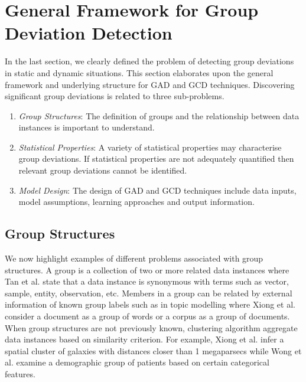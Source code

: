 \section{ General Framework for Group Deviation Detection
}
 \label{Sec:Framework}
In the last section, we clearly defined the problem of detecting group deviations in static and dynamic situations.   
  This section elaborates  upon the general framework and underlying structure for GAD and GCD techniques. Discovering significant group deviations is related to three sub-problems. 
\begin{enumerate}[1.]
\item {\it Group Structures}:  The definition of groups and the relationship between data instances is important to understand. %
\item {\it Statistical Properties}:  
A variety of statistical properties may characterise group deviations. %
 If statistical properties  are  not adequately quantified then relevant group deviations cannot be identified.
\item  {\it Model Design}: 
 The design of GAD and GCD techniques include data inputs,   model assumptions, learning approaches and output information. 
\end{enumerate}


\subsection{Group Structures}
We now highlight examples of different problems associated with group structures.   A group is a collection of two or more related data instances where Tan et al.  \cite{Tan} state that a data instance is synonymous with terms such as  vector, sample, entity, observation, etc. %
Members in a group can be related by  external information of known group labels such as in topic modelling where Xiong et al. \cite{FGM} consider a document as a group of  words or a corpus as a group of documents. When group structures are not previously known, clustering algorithm aggregate data instances based on similarity criterion. 
 For example, Xiong et al. \cite{MGM} infer a spatial cluster of galaxies with distances closer than 1 megaparsecs while Wong et al. \cite{wong-rule} examine a demographic group of patients  based on certain categorical features.  
  

